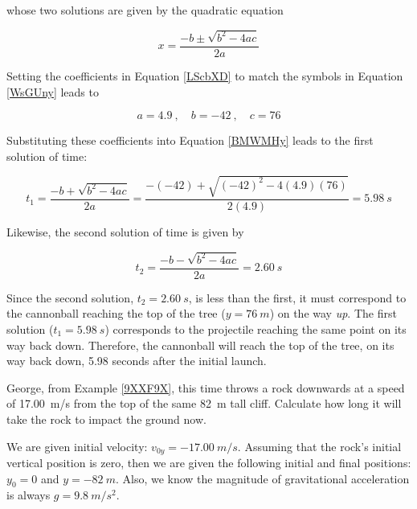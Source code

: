 \documentclass[main.tex]{subfiles}
\begin{document}
whose two solutions are given by the quadratic equation

\begin{equation} \label{BMWMHy}
    x = \frac{-b \pm \sqrt{b^2 - 4ac}}{2a}
\end{equation}

Setting the coefficients in Equation \eqref{LScbXD} to match the symbols in Equation \eqref{WsGUny} leads to 

\begin{equation*}
    a = 4.9\ , \quad b = -42\ ,\quad c = 76
\end{equation*}

Substituting these coefficients into Equation \eqref{BMWMHy} leads to the first solution of time:

\begin{equation*}
    t_1 = \frac{-b + \sqrt{b^2 - 4ac}}{2a} = \frac{-(-42) + \sqrt{(-42)^2 - 4 (4.9)(76)}}{2(4.9)} = \SI{5.98}{s}
\end{equation*}

Likewise, the second solution of time is given by

\begin{equation*}
    t_2 = \frac{-b - \sqrt{b^2 - 4ac}}{2a} = \SI{2.60}{s}
\end{equation*}

Since the second solution, $t_2 = \SI{2.60}{s}$, is less than the first, it must correspond to the cannonball reaching the top of the tree ($y=\SI{76}{m}$) on the way \textit{up}. The first solution ($t_1 = \SI{5.98}{s}$) corresponds to the projectile reaching the same point on its way back down. Therefore, the cannonball will reach the top of the tree, on its way back down, 5.98 seconds after the initial launch.

\solutionEnd


\begin{example} \label{pyn6Go}
    George, from Example \ref{9XXF9X}, this time throws a rock downwards at a speed of \SI{17.00}{m/s} from the top of the same \SI{82}{m} tall cliff. Calculate how long it will take the rock to impact the ground now.
\end{example}

\Solution We are given initial velocity: $v_{0y} = \SI{-17.00}{m/s}$. Assuming that the rock's initial vertical position is zero, then we are given the following initial and final positions: $y_0 = 0$ and $y = \SI{-82}{m}$. Also, we know the magnitude of gravitational acceleration is always $g = \SI{9.8}{m/s^2}$. 
\end{document}
